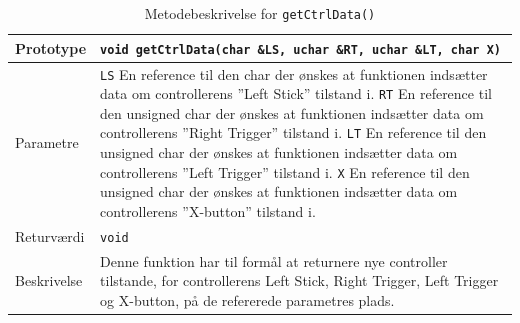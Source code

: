 \begin{table}[h]
\begin{tabularx}{\textwidth}{| L{2.5 cm} | Z |} \hline
Prototype 	& \texttt{void getCtrlData(char \&LS, uchar \&RT, uchar \&LT, char X)} \\\hline
Parametre 	& \texttt{LS}				\newline En reference til den char der ønskes at funktionen indsætter data om controllerens ''Left Stick'' tilstand i.				\newline \newline
			  \texttt{RT}				\newline En reference til den unsigned char der ønskes at funktionen indsætter data om controllerens ''Right Trigger'' tilstand i.\newline \newline
			  \texttt{LT}				\newline En reference til den unsigned char der ønskes at funktionen indsætter data om controllerens ''Left Trigger'' tilstand i.\newline \newline
			  \texttt{X}				\newline En reference til den unsigned char der ønskes at funktionen indsætter data om controllerens ''X-button'' tilstand i. \\\hline
Returværdi	& \texttt{void} 			\newline \\\hline
Beskrivelse	&  Denne funktion har til formål at returnere nye controller tilstande, for controllerens Left Stick, Right Trigger, Left Trigger og X-button, på de refererede parametres plads.\\\hline
\end{tabularx}
\caption{Metodebeskrivelse for \texttt{getCtrlData()}}
\label{table:met_getctrldata}
\end{table}